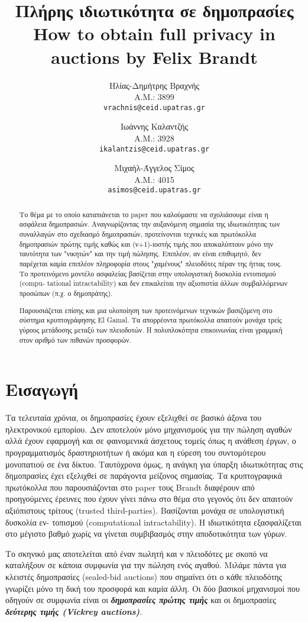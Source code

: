 \documentclass[a4paper,11pt]{article}
\title{
	Πλήρης ιδιωτικότητα σε δημοπρασίες \\
	\vspace{3mm}
	\normalsize{\textbf{How to obtain full privacy in auctions} by \textbf{Felix Brandt}} \\
}
\author{
	Ηλίας-Δημήτρης Βραχνής\\
	Α.Μ.: 3899\\
	\texttt{vrachnis@ceid.upatras.gr}
\and
	Ιωάννης Καλαντζής\\
	Α.Μ.: 3928\\
	\texttt{ikalantzis@ceid.upatras.gr}
\and
	Μιχαήλ-Άγγελος Σίμος\\
	Α.Μ.: 4015\\
	\texttt{asimos@ceid.upatras.gr}
}
\date{}
\begin{document}
\maketitle

\begin{abstract} Το θέμα με το οποίο καταπιάνεται το paper που καλούμαστε να σχολιάσουμε είναι η ασφάλεια δημοπρασιών. Αναγνωρίζοντας την
αυξανόμενη σημασία της ιδιωτικότητας των συναλλαγών στο σχεδιασμό δημοπρασιών, προτείνονται τεχνικές και πρωτόκολλα δημοπρασιών πρώτης τιμής καθώς
και (ν+1)-ιοστής τιμής που αποκαλύπτουν μόνο την ταυτότητα των "νικητών" και την τιμή πώλησης. Επιπλέον, αν είναι επιθυμητό, δεν παρέχεται καμία
επιπλέον πληροφορία στους "χαμένους" πλειοδότες πέραν της ήττας τους. Το προτεινόμενο μοντέλο ασφαλείας βασίζεται στην υπολογιστική δυσκολία
εντοπισμού (compu- tational intractability) και δεν επικαλείται την αξιοπιστία άλλων συμβαλλόμενων προσώπων (π.χ. ο δημοπράτης).

Παρουσιάζεται επίσης και μια υλοποίηση των προτεινόμενων τεχνικών βασιζόμενη στο σύστημα κρυπτογράφησης El Gamal. Τα απορρέοντα πρωτόκολλα απαιτούν
μονάχα τρείς γύρους μετάδοσης μεταξύ των πλειοδοτών. Η πολυπλοκότητα επικοινωνίας είναι γραμμική στον αριθμό των πιθανών προσφορών. 
\end{abstract}

\section{Εισαγωγή} Τα τελευταία χρόνια, οι δημοπρασίες έχουν εξελιχθεί σε βασικό άξονα του ηλεκτρονικού
εμπορίου. Δεν αποτελούν μόνο μηχανισμούς για την πώληση αγαθών αλλά έχουν εφαρμογή και σε φαινομενικά άσχετους
τομείς όπως η ανάθεση έργων, ο προγραμματισμός δραστηριοτήτων ή ακόμα και η εύρεση του συντομότερου μονοπατιού
σε ένα δίκτυο. Ταυτόχρονα όμως, η ανάγκη για ύπαρξη ιδιωτικότητας στις δημοπρασίες έχει εξελιχθεί σε παράγοντα
μείζονος σημασίας. Τα κρυπτογραφικά πρωτόκολλα που παρουσιάζονται στο paper τους Brandt διαφέρουν από
προηγούμενες έρευνες που έχουν γίνει πάνω στο θέμα στο γεγονός ότι δεν απαιτούν αξιόπιστους τρίτους (trusted
third-parties). Βασίζονται μονάχα σε υπολογιστική δυσκολία εν- τοπισμού (computational intractability). Η
ιδιωτικότητα εξασφαλίζεται στο μέγιστο βαθμό χωρίς να γίνεται συμβιβασμός στην αποδοτικότητα των γύρων.

Το σκηνικό μας αποτελείται από έναν πωλητή και ν πλειοδότες με σκοπό να καταλήξουν σε κάποια συμφωνία για την
πώληση ενός αγαθού. Μιλάμε πάντα για κλειστές δημοπρασίες (sealed-bid auctions) που σημαίνει ότι ο κάθε
πλειοδότης γνωρίζει μόνο τη δική του προσφορά και καμία άλλη. Οι δύο βασικοί μηχανισμοί που οδηγούν σε
συμφωνία είναι οι \textbf{\emph{δημοπρασίες πρώτης τιμής}} και οι δημοπρασίες \textbf{\emph{δεύτερης τιμής
(Vickrey auctions\cite{Vickrey})}}.
\end{document}
